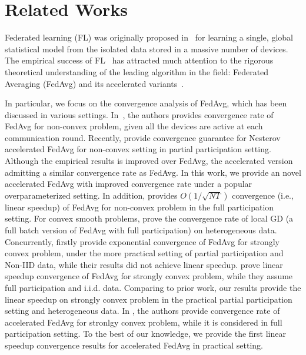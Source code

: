 
\section{Related Works}

Federated learning (FL) was originally proposed
in~\cite{mcmahan2016communication} for learning a single, global statistical
model from the isolated data stored in a massive number of devices.  The
empirical success of FL~\cite{chen2018federated,47586} has attracted much attention to the rigorous theoretical understanding of the leading algorithm in the field: Federated Averaging (FedAvg) and its accelerated variants~\cite{liu2019accelerating,haddadpour2019convergence,khaled2019first,li2019convergence,huo2020faster,yu2019linear,yu2019parallel}.

In particular, we focus on the convergence analysis of FedAvg, which
has been discussed in various settings. 
In~\cite{yu2019parallel,wang2019adaptive}, the authors provides convergence
rate of FedAvg for non-convex problem, given all the devices are active at
each communication round. Recently, \citep{huo2020faster} provide 
convergence guarantee for Nesterov accelerated FedAvg for non-convex 
setting in partial participation setting. Although the empirical
results is improved over FedAvg, the accelerated version admitting a similar 
convergence rate as FedAvg. In this work, we provide an novel accelerated
FedAvg with improved convergence rate under a popular overparameterized 
setting. In addition, \cite{yu2019linear} provides $O(1/\sqrt{NT})$ 
convergence (i.e., linear speedup) of FedAvg for non-convex problem in the full participation setting. 
For convex smooth problems, \cite{khaled2019first} prove the 
convergence rate of local GD (a full batch version of FedAvg with full participation) on heterogeneous data. 
Concurrently, \cite{li2019convergence} firstly provide exponential convergence of FedAvg for strongly convex problem,
under the more practical setting of partial participation and Non-IID data,
while their results did not achieve linear speedup. 
\cite{stich2018local} prove linear speedup convergence of FedAvg for strongly convex problem, while they assume full participation and i.i.d. data.
Comparing to prior work, our results provide the linear speedup on strongly convex problem in the practical partial participation setting and heterogeneous data. In \cite{liu2019accelerating}, the authors provide convergence rate of accelerated FedAvg for stronlgy convex problem, while it is considered in full participation setting. To the best of our knowledge,
we provide the first linear speedup convergence results for 
accelerated FedAvg in practical setting.









